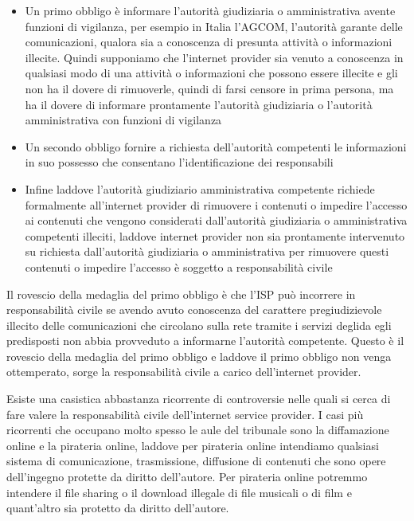 \begin{itemize}
    \item Un primo obbligo è informare l'autorità giudiziaria o amministrativa avente funzioni di vigilanza, per esempio in Italia l'AGCOM, l'autorità garante delle comunicazioni, qualora sia a conoscenza di presunta attività o informazioni illecite. Quindi supponiamo che l'internet provider sia venuto a conoscenza in qualsiasi modo di una attività o informazioni che possono essere illecite e gli non ha il dovere di rimuoverle, quindi di farsi censore in prima persona, ma ha il dovere di informare prontamente l'autorità giudiziaria o l'autorità amministrativa con funzioni di vigilanza
    \item Un secondo obbligo fornire a richiesta dell'autorità competenti le informazioni in suo possesso che consentano l'identificazione dei responsabili
    \item Infine laddove l'autorità giudiziario amministrativa competente richiede formalmente all'internet provider di rimuovere i contenuti o impedire l'accesso ai contenuti che vengono considerati dall'autorità giudiziaria o amministrativa competenti illeciti, laddove internet provider non sia prontamente intervenuto su richiesta dall'autorità giudiziaria o amministrativa per rimuovere questi contenuti o impedire l'accesso è soggetto a responsabilità civile

\end{itemize}

Il rovescio della medaglia del primo obbligo è che l'ISP può incorrere in responsabilità civile se avendo avuto conoscenza del carattere pregiudizievole illecito delle comunicazioni che circolano sulla rete tramite i servizi deglida egli predisposti non abbia provveduto a informarne l'autorità competente. Questo è il rovescio della medaglia del primo obbligo e laddove il primo obbligo non venga ottemperato, sorge la responsabilità civile a carico dell'internet provider. 

Esiste una casistica abbastanza ricorrente di controversie nelle quali si cerca di fare valere la responsabilità civile dell'internet service provider. I casi più ricorrenti che occupano molto spesso le aule del tribunale sono la diffamazione online e la pirateria online, laddove per pirateria online intendiamo qualsiasi sistema di comunicazione, trasmissione, diffusione di contenuti che sono opere dell'ingegno protette da diritto dell'autore. Per pirateria online potremmo intendere il file sharing o il download illegale di file musicali o di film e quant'altro sia protetto da diritto dell'autore. 

